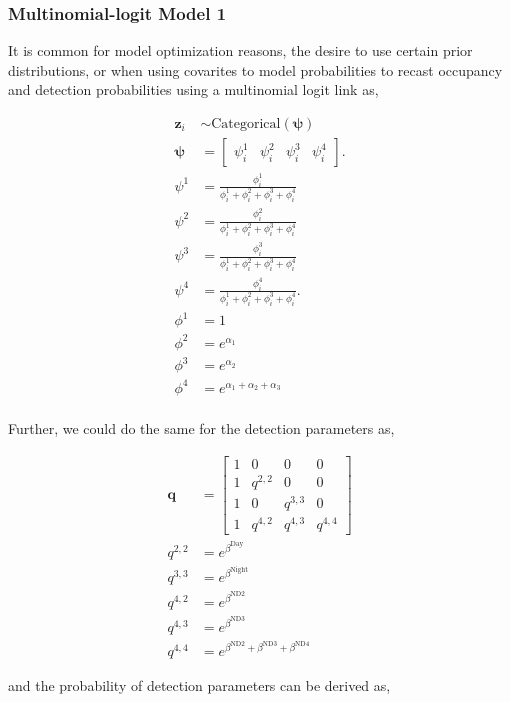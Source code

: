 \documentclass[12pt]{article}
\begin{document}
\subsubsection{Multinomial-logit Model 1}
It is common for model optimization reasons, the desire to use certain prior distributions, or when using covarites to model probabilities to recast occupancy and detection probabilities using a multinomial logit link as, 
\begin{center}
\begin{align*}
\textbf{z}_{i} &\sim \text{Categorical}(\boldsymbol{\psi})\\
\boldsymbol{\psi} &= \begin{bmatrix} \psi^1_{i} & \psi^2_{i} & \psi^3_{i} & \psi^4_{i} \end{bmatrix}.\\
\psi^1 &=\frac{\phi^1_{i}}{\phi^1_{i}+ \phi^2_{i}+\phi^3_{i}+\phi^4_{i}}\\
\psi^2 &=\frac{\phi^2_{i}}{\phi^1_{i}+ \phi^2_{i}+\phi^3_{i}+\phi^4_{i}}\\
\psi^3 &=\frac{\phi^3_{i}}{\phi^1_{i}+ \phi^2_{i}+\phi^3_{i}+\phi^4_{i}}\\
\psi^4 &=\frac{\phi^4_{i}}{\phi^1_{i}+ \phi^2_{i}+\phi^3_{i}+\phi^4_{i}}.\\
\phi^1 &= 1\\
\phi^2 &= e^{\alpha_{1}}\\
\phi^3 &= e^{\alpha_{2}}\\
\phi^4 &= e^{\alpha_{1}+\alpha_{2}+\alpha_{3}}\\
\end{align*}
\end{center}

Further, we could do the same for the detection parameters as, 
\begin{center}
\begin{align*}
\boldsymbol{q} &= \begin{bmatrix} 1 & 0 & 0 & 0 \\ 
									1 &  q^{2,2} & 0 & 0 \\ 
									1 & 0 & q^{3,3} & 0\\
  								       1 & q^{4,2} & q^{4,3} & q^{4,4}
  								      \end{bmatrix}\\
q^{2,2} &=e^{\beta^{\text{Day}}}\\
q^{3,3} &=e^{\beta^{\text{Night}}}\\
q^{4,2} &=e^{\beta^{\text{ND2}}}\\
q^{4,3} &=e^{\beta^{\text{ND3}}}\\
q^{4,4} &=e^{\beta^{\text{ND2}}+\beta^{\text{ND3}}+\beta^{\text{ND4}}}
\end{align*}
\end{center}
and the probability of detection parameters can be derived as, 
\end{document}
